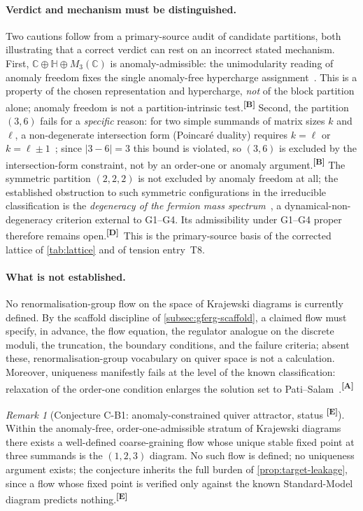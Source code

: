 \documentclass[12pt,a4paper,twoside]{article}
\theoremstyle{plain}
\theoremstyle{definition}
\theoremstyle{remark}
\newtheorem{remark}[theorem]{Remark}
\newcommand{\catmark}[1]{\textsuperscript{\textsf{\textbf{[#1]}}}}
\begin{document}
\paragraph{Verdict and mechanism must be distinguished.}
Two cautions follow from a primary-source audit of candidate partitions,
both illustrating that a correct verdict can rest on an incorrect stated
mechanism. First, $\mathbb{C}\oplus\mathbb{H}\oplus M_3(\mathbb{C})$ is
anomaly-admissible: the unimodularity reading of anomaly freedom fixes
the single anomaly-free hypercharge assignment~\cite{agbm1995}. This is a
property of the chosen representation and hypercharge, \emph{not} of the
block partition alone; anomaly freedom is not a partition-intrinsic
test.\catmark{B} Second, the partition $(3,6)$ fails for a
\emph{specific} reason: for two simple summands of matrix sizes $k$ and
$\ell$, a non-degenerate intersection form (Poincar\'e duality) requires
$k=\ell$ or $k=\ell\pm 1$~\cite{iss2004}; since $|3-6|=3$ this bound is
violated, so $(3,6)$ is excluded by the intersection-form constraint, not
by an order-one or anomaly argument.\catmark{B} The symmetric partition
$(2,2,2)$ is not excluded by anomaly freedom at all; the established
obstruction to such symmetric configurations in the irreducible
classification is the \emph{degeneracy of the fermion mass
spectrum}~\cite{iss2004}, a dynamical-non-degeneracy criterion external
to G1--G4. Its admissibility under G1--G4 proper therefore remains
open.\catmark{D}\ This is the primary-source basis of the corrected
lattice of \cref{tab:lattice} and of tension entry~T8.

\paragraph{What is not established.}
No renormalisation-group flow on the space of Krajewski diagrams is
currently defined. By the scaffold discipline of
\cref{subsec:gferg-scaffold}, a claimed flow must specify, in advance,
the flow equation, the regulator analogue on the discrete moduli, the
truncation, the boundary conditions, and the failure criteria; absent
these, renormalisation-group vocabulary on quiver space is not a
calculation. Moreover, uniqueness manifestly fails at the level of the
known classification: relaxation of the order-one condition enlarges the
solution set to Pati--Salam~\cite{ccvs2013,farnsworth2015}.\catmark{A}

\begin{remark}[Conjecture C-B1: anomaly-constrained quiver attractor, status \catmark{E}]
\label{rem:quiver-conjecture}
Within the anomaly-free, order-one-admissible stratum of Krajewski
diagrams there exists a well-defined coarse-graining flow whose unique
stable fixed point at three summands is the $(1,2,3)$ diagram. No such
flow is defined; no uniqueness argument exists; the conjecture inherits
the full burden of \cref{prop:target-leakage}, since a flow whose fixed
point is verified only against the known Standard-Model diagram predicts
nothing.\catmark{E}
\end{remark}
\end{document}
